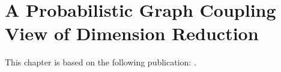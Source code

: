 
\chapter{A Probabilistic Graph Coupling View of Dimension Reduction}\label{chapter:GraphCoupling}


\minitoc

This chapter is based on the following publication: \cite{van2022probabilistic}.






